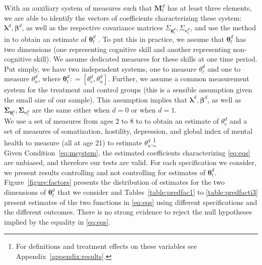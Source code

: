 \noindent With an auxiliary system of measures such that $\bm{M}_{t}^d $ has at least three elements, we are able to identify the vectors of coefficients characterizing these system: $\bm{\lambda}^d, \bm{\beta}^d$, as well as the respective covariance matrices $\Sigma_{\bm{\theta}_{t}^d}, \Sigma_{\bm{\upsilon}_{t}^d}$, and use the method in \citet{Bartlett_1938_Nature} to obtain an estimate of $\bm{\theta}_{t}^d$ \citep{Cunha_Heckman_ea_2005_oep,Cunha_Heckman_etal_2010_est_tech_cognoncog}. To put this in practice, we assume that $\bm{\theta}_{t}^d$ has two dimensions (one representing cognitive skill and another representing non-cognitive skill). We assume dedicated measures for these skills at one time period. Put simply, we have two independent systems, one to measure $\theta_{c}^d$ and one to measure $\theta_{n}^d$, where $\bm{\theta}_{t}^d: = \left[ \theta_{c}^d, \theta_{n}^d \right]$. Further, we assume a common measurement system for the treatment and control groups (this is a sensible assumption given the small size of our sample). This assumption implies that $\bm{\lambda}^d, \bm{\beta}^d$, as well as $\bm{\Sigma}_{\bm{\theta}_{t}^d}, \bm{\Sigma}_{\bm{\upsilon}_{t}^d}$ are the same either when $d = 0$ or when $d = 1$.\\

\noindent We use a set of measures from ages 2 to 8 to to obtain an estimate of $\theta_{c}^d$ and a set of measures of somatization, hostility, depression, and global index of mental health to measure (all at age 21) to estimate $\theta_{n}^d$.\footnote{For definitions and treatment effects on these variables see Appendix~\ref{appendix:results}.}\\

\noindent Given Condition~\eqref{eq:msystem}, the estimated coefficients characterizing \eqref{eq:eqs} are unbiased, and therefore our tests are valid. For each specification we consider, we present results controlling and not controlling for estimates of $\bm{\theta}_{t}^d$. Figure~\ref{figure:factors} presents the distribution of estimates for the two dimensions of $\bm{\theta}_{t}^d$ that we consider and Tables~\ref{table:predfac1} to \ref{table:predfacti3} present estimates of the two functions in \eqref{eq:eqs} using different specifications and the different outcomes. There is no strong evidence to reject the null hypotheses implied by the equality in \eqref{eq:eqs}.


